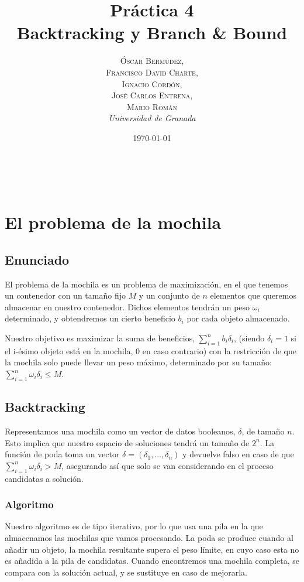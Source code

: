 \documentclass[a4paper, 11pt]{article} %
\title{\textbf{Práctica 4}\\ %
Backtracking y Branch \& Bound} %
\author{\textsc{Óscar Bermúdez,\\Francisco David Charte,\\Ignacio Cordón,\\José Carlos Entrena,\\Mario Román} %
\\{\textit{Universidad de Granada}}} %
\date{\today} %
\makeatletter
\renewcommand{\maketitle}{ %
\begin{flushright} %
    {\LARGE\@title} %
    
    \vspace{50pt} %
    
    {\large\@author} %
    \\\@date %
    
    \vspace{40pt} %
\end{flushright}
}
\makeatother
\begin{document}
    
    \maketitle %
    
    \renewcommand{\abstractname}{Resumen} %
    \begin{abstract}
    \end{abstract}
    {\parskip=2pt
    \tableofcontents
    }
    \pagebreak
    
    
    \section{El problema de la mochila}
      \subsection{Enunciado}
	El problema de la mochila es un problema de maximización, en el que tenemos un contenedor con un tamaño 
	fijo $M$ y un conjunto de $n$ elementos que queremos almacenar en nuestro contenedor. Dichos elementos tendrán un peso $\omega_i$
	determinado, y obtendremos un cierto beneficio $b_i$ por cada objeto almacenado.
	
	Nuestro objetivo es maximizar la suma de beneficios, $\sum_{i=1}^{n} b_i\delta_i$, (siendo $\delta_i = 1$ si el i-ésimo objeto 
	está en la mochila, 0 en caso contrario) con la restricción de que la mochila solo puede llevar un peso máximo, determinado por 
	su tamaño: $\sum_{i=1}^{n} \omega_i\delta_i \leq M$.
    
      \subsection{Backtracking}
	Representamos una mochila como un vector de datos booleanos, $\delta$, de tamaño $n$. Esto implica 
	que nuestro espacio de soluciones tendrá un tamaño de $2^n$. La función de poda toma un vector 
	$\delta = (\delta_1, \dots, \delta_n)$ y devuelve falso en caso de que $\sum_{i=1}^{n} \omega_i\delta_i > M$, 
	asegurando así que solo se van considerando en el proceso candidatas a solución.
    
	\newpage
    
	\subsubsection{Algoritmo}
	  Nuestro algoritmo es de tipo iterativo, por lo que usa una pila en la que almacenamos las mochilas que 
	  vamos procesando. La poda se produce cuando al añadir un objeto, la mochila resultante supera el peso 
	  límite, en cuyo caso esta no es añadida a la pila de candidatas. Cuando encontremos una mochila completa, 
	  se compara con la solución actual, y se sustituye en caso de mejorarla. 
    
\end{document}
